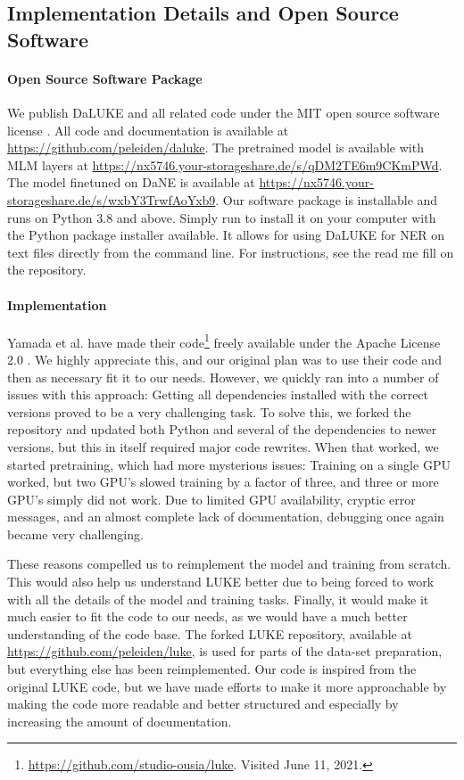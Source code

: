 \documentclass[main.tex]{subfiles}
\begin{document}
\subsection{Implementation Details and Open Source Software}%
\label{sub:oss}

\paragraph{Open Source Software Package}
We publish DaLUKE and all related code under the MIT open source software license \cite{mitlicense}.
All code and documentation is available at \url{https://github.com/peleiden/daluke}.
The pretrained model is available with MLM layers at \url{https://nx5746.your-storageshare.de/s/qDM2TE6m9CKmPWd}.
The model finetuned on DaNE is available at \url{https://nx5746.your-storageshare.de/s/wxbY3TrwfAoYxb9}.
Our software package is  installable and runs on Python 3.8 and above.
Simply run  to install it on your computer with the Python package installer  available.
It allows for using DaLUKE for NER on text files directly from the command line.
For instructions, see the read me fill on the repository.

\paragraph{Implementation}
Yamada et al. have made their code\footnote{\url{https://github.com/studio-ousia/luke}. Visited June 11, 2021.} freely available under the Apache License 2.0 \cite{apachelicense}.
We highly appreciate this, and our original plan was to use their code and then as necessary fit it to our needs.
However, we quickly ran into a number of issues with this approach:
Getting all dependencies installed with the correct versions proved to be a very challenging task.
To solve this, we forked the repository and updated both Python and several of the dependencies to newer versions, but this in itself required major code rewrites.
When that worked, we started pretraining, which had more mysterious issues:
Training on a single GPU worked, but two GPU's slowed training by a factor of three, and three or more GPU's simply did not work.
Due to limited GPU availability, cryptic error messages, and an almost complete lack of documentation, debugging once again became very challenging.

These reasons compelled us to reimplement the model and training from scratch.
This would also help us understand LUKE better due to being forced to work with all the details of the model and training tasks.
Finally, it would make it much easier to fit the code to our needs, as we would have a much better understanding of the code base.
The forked LUKE repository, available at \url{https://github.com/peleiden/luke}, is used for parts of the data-set preparation, but everything else has been reimplemented.
Our code is inspired from the original LUKE code, but we have made efforts to make it more approachable by making the code more readable and better structured and especially by increasing the amount of documentation.
\end{document}
